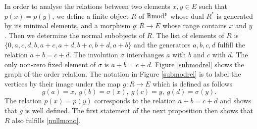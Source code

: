 \documentclass[12pt]{article}
\def\B{{\mathbb B}}
\def\b2{{\rm \B mod^{\mathfrak s}}}
\begin{document}
In order to analyse the relations between two elements $x,y\in E$ such that $p(x)=p(y)$, we define a  finite object $R$ of $\b2$ whose dual $R^*$ is generated by its minimal elements, and a morphism $g:R\to E$ whose range  contains $x$ and $y$. Then we determine the normal subobjects of $R$.
The list of elements of $R$ is $\{0,a,c,d,b,a+c,a+d,b+c,b+d,a+b\}$ and the generators $a,b,c,d$ fulfill the relation $a+b=c+d$. The involution $\sigma$ interchanges $a$ with $b$ and $c$ with $d$. The only non-zero fixed element of $\sigma$ is $a+b=c+d$. Figure \ref{submodrel} shows the graph of the order relation. The notation in Figure \ref{submodrel} is to label the vertices by their image under the map $g:R\to E$ which is defined as follows
$$
g(a)=x,\ g(b)=\sigma(x), \ g(c)=y, \ g(d)=\sigma(y). 
$$
The relation $p(x)=p(y)$ corresponds to the relation $a+b=c+d$ and shows that $g$ is well defined. The first statement of the next proposition then shows that $R$ also fulfills  \eqref{nullmono}.
\end{document}

